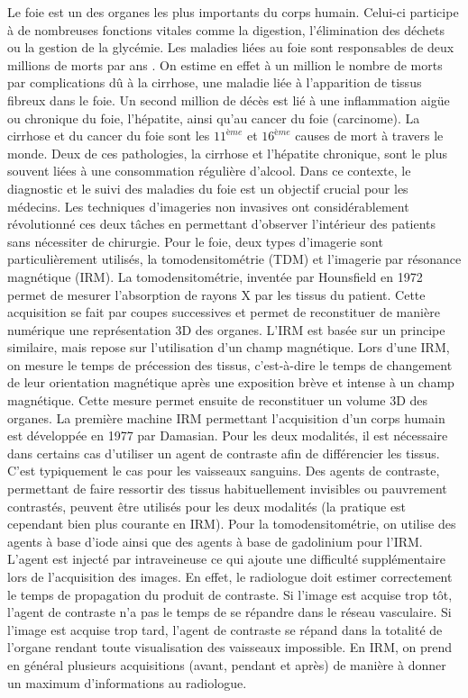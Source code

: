 Le foie est un des organes les plus importants du corps humain. Celui-ci participe à de nombreuses fonctions vitales comme la digestion, l'élimination des déchets ou la gestion de la glycémie. Les maladies liées au foie sont responsables de deux millions de morts par ans \cite{Asrani2019_liver_deseases}. On estime en effet à un million le nombre de morts par complications dû à la cirrhose, une maladie liée à l'apparition de tissus fibreux dans le foie. Un second million de décès est lié à une inflammation aigüe ou chronique du foie, l'hépatite, ainsi qu'au cancer du foie (carcinome). La cirrhose et du cancer du foie sont les $11^{ème}$ et $16^{ème}$ causes de mort à travers le monde. Deux de ces pathologies, la cirrhose et l'hépatite chronique, sont le plus souvent liées à une consommation régulière d'alcool. 
Dans ce contexte, le diagnostic et le suivi des maladies du foie est un objectif crucial pour les médecins. Les techniques d'imageries non invasives ont considérablement révolutionné ces deux tâches en permettant d'observer l'intérieur des patients sans nécessiter de chirurgie. Pour le foie, deux types d'imagerie sont particulièrement utilisés, la tomodensitométrie (TDM) et l'imagerie par résonance magnétique (IRM). La tomodensitométrie, inventée par Hounsfield en 1972 permet de mesurer l'absorption de rayons X par les tissus du patient. Cette acquisition se fait par coupes successives et permet de reconstituer de manière numérique une représentation 3D des organes. L'IRM est basée sur un principe similaire, mais repose sur l'utilisation d'un champ magnétique. Lors d'une IRM, on mesure le temps de précession des tissus, c'est-à-dire le temps de changement de leur orientation magnétique après une exposition brève et intense à un champ magnétique. Cette mesure permet ensuite de reconstituer un volume 3D des organes. La première machine IRM permettant l'acquisition d'un corps humain est développée en 1977 par Damasian. Pour les deux modalités, il est nécessaire dans certains cas d'utiliser un agent de contraste afin de différencier les tissus. C'est typiquement le cas pour les vaisseaux sanguins. 
Des agents de contraste, permettant de faire ressortir des tissus habituellement invisibles ou pauvrement contrastés, peuvent être utilisés pour les deux modalités (la pratique est cependant bien plus courante en IRM). Pour la tomodensitométrie, on utilise des agents à base d'iode ainsi que des agents à base de gadolinium pour l'IRM. L'agent est injecté par intraveineuse ce qui ajoute une difficulté supplémentaire lors de l'acquisition des images. En effet, le radiologue doit estimer correctement le temps de propagation du produit de contraste. Si l'image est acquise trop tôt, l'agent de contraste n'a pas le temps de se répandre dans le réseau vasculaire. Si l'image est acquise trop tard, l'agent de contraste se répand dans la totalité de l'organe rendant toute visualisation des vaisseaux impossible. En IRM, on prend en général plusieurs acquisitions (avant, pendant et après) de manière à donner un maximum d'informations au radiologue.
